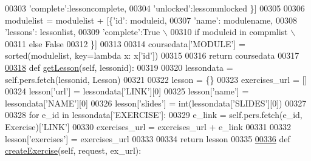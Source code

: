 \begin{DoxyCode}
00303                                             \textcolor{stringliteral}{'complete'}:lessoncomplete,
00304                                             \textcolor{stringliteral}{'unlocked'}:lessonunlocked \}]
00305 
00306             modulelist = modulelist + [\{\textcolor{stringliteral}{'id'}:       moduleid,
00307                                         \textcolor{stringliteral}{'name'}:     modulename,
00308                                         \textcolor{stringliteral}{'lessons'}:  lessonlist,
00309                                         \textcolor{stringliteral}{'complete'}:\textcolor{keyword}{True} \(\backslash\)
00310                                             \textcolor{keywordflow}{if} moduleid \textcolor{keywordflow}{in} compmlist \(\backslash\)
00311                                             \textcolor{keywordflow}{else} \textcolor{keyword}{False}
00312                                       \}]
00313         
00314         coursedata[\textcolor{stringliteral}{'MODULE'}] = sorted(modulelist, key=\textcolor{keyword}{lambda} x: x[\textcolor{stringliteral}{'id'}])
00315 
00316         \textcolor{keywordflow}{return} coursedata
00317 
\hypertarget{CourseUnit_8py_source_l00318}{}\hyperlink{classCourse_1_1CourseUnit_1_1BusCourse_adc4fcfde76feb1d6da3cf6bee39583b1}{00318}     \textcolor{keyword}{def }\hyperlink{classCourse_1_1CourseUnit_1_1BusCourse_adc4fcfde76feb1d6da3cf6bee39583b1}{getLesson}(self, lessonid):
00319 
00320         lessondata = self.pers.fetch(lessonid, Lesson)
00321 
00322         lesson = \{\}
00323         exercises\_url = []
00324         lesson[\textcolor{stringliteral}{'url'}] = lessondata[\textcolor{stringliteral}{'LINK'}][0]
00325         lesson[\textcolor{stringliteral}{'name'}] = lessondata[\textcolor{stringliteral}{'NAME'}][0]
00326         lesson[\textcolor{stringliteral}{'slides'}] = int(lessondata[\textcolor{stringliteral}{'SLIDES'}][0])
00327 
00328         \textcolor{keywordflow}{for} e\_id \textcolor{keywordflow}{in} lessondata[\textcolor{stringliteral}{'EXERCISE'}]:
00329             e\_link = self.pers.fetch(e\_id, Exercise)[\textcolor{stringliteral}{'LINK'}]
00330             exercises\_url = exercises\_url + e\_link
00331 
00332         lesson[\textcolor{stringliteral}{'exercises'}] = exercises\_url
00333 
00334         \textcolor{keywordflow}{return} lesson
00335 
\hypertarget{CourseUnit_8py_source_l00336}{}\hyperlink{classCourse_1_1CourseUnit_1_1BusCourse_a4b9b8ec5eb949d3a1b42aee125b1b90b}{00336}     \textcolor{keyword}{def }\hyperlink{classCourse_1_1CourseUnit_1_1BusCourse_a4b9b8ec5eb949d3a1b42aee125b1b90b}{createExercise}(self, request, ex\_url):

\end{DoxyCode}
